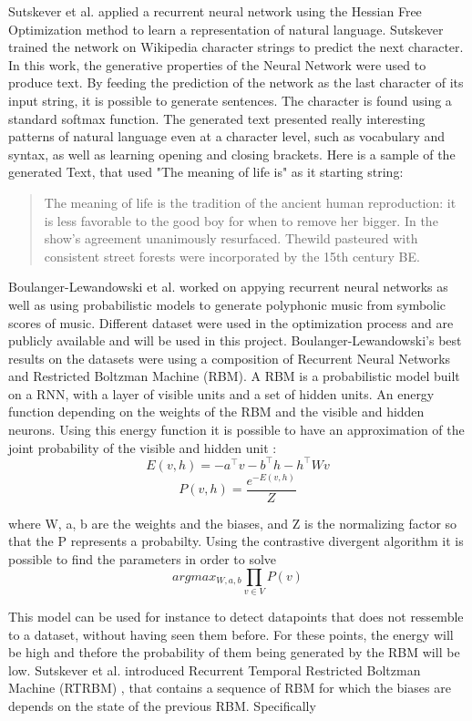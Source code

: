 Sutskever et al. \cite{sutskever2011generating} applied a recurrent neural network using the Hessian Free Optimization method to learn a representation of natural language. Sutskever trained the network on Wikipedia character strings to predict the next character. In this work, the generative properties of the Neural Network were used to produce text. By feeding the prediction of the network as the last character of its input string, it is possible to generate sentences. The character is found using a standard softmax function. The generated text presented really interesting patterns of natural language even at a character level, such as vocabulary and syntax, as well as learning opening and closing brackets. Here is a sample of the generated Text, that used "The meaning of life is" as it starting string: 

\begin{quote}
The meaning of life is the tradition of the ancient human reproduction: it is less favorable to the good boy for when to remove her bigger. In the show’s agreement unanimously resurfaced. Thewild pasteured with consistent street forests were incorporated by the 15th century BE.
\end{quote}

Boulanger-Lewandowski et al. worked on appying recurrent neural networks as well as using probabilistic models to generate polyphonic music from symbolic scores of music\cite{boulanger2012modeling}. Different dataset were used in the optimization process and are publicly available and will be used in this project. Boulanger-Lewandowski's best results on the datasets were using a composition of Recurrent Neural Networks and Restricted Boltzman Machine (RBM). A RBM is a probabilistic model built on a RNN, with a layer of visible units and a set of hidden units. An energy function depending on the weights of the RBM and the visible and hidden neurons. Using this energy function it is possible to have an approximation of the joint probability of the visible and hidden unit :
$$ E(v, h) = -a ^\top v - b^\top h - h^\top W v$$
$$ P(v, h) = \frac {e^{-E(v, h)}} Z$$

where W, a, b are the weights and the biases, and Z is the normalizing factor so that the P represents a probabilty. Using the contrastive divergent algorithm it is possible to find the parameters in order to solve $$ argmax_{W, a, b} \prod_{v \in V} P(v) $$

This model can be used for instance to detect datapoints that does not ressemble to a dataset, without having seen them before. For these points, the energy will be high and thefore the probability of them being generated by the RBM will be low. Sutskever et al. introduced Recurrent Temporal Restricted Boltzman Machine (RTRBM) \cite{sutskever2008recurrent}, that contains a sequence of RBM for which the biases are depends on the state of the previous RBM. Specifically 

